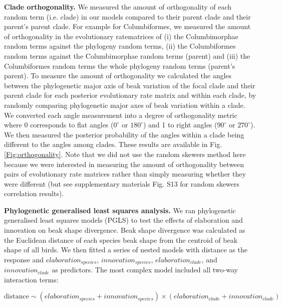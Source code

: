 \documentclass[12pt,letterpaper]{article}
\begin{document}
\textbf{Clade orthogonality.} We measured the amount of orthogonality of each random term (i.e.
clade) in our models compared to their parent clade and their parent's parent clade.
For example for Columbiformes, we measured the amount of orthogonality in the evolutionary ratematrices of (i) the Columbimorphae random terms against the phylogeny random terms, (ii) the Columbiformes random terms against the Columbimorphae random terms (parent) and (iii) the Columbiformes random terms the whole phylogeny random terms (parent's parent).
To measure the amount of orthogonality we calculated the angles between the phylogenetic major axis of beak variation of the focal clade and their parent clade for each posterior evolutionary rate matrix and within each clade, by randomly comparing phylogenetic major axes of beak variation within a clade.
We converted each angle measurement into a degree of orthogonality metric where 0 corresponds to flat angles ($0^\circ$ or  $180^\circ$) and 1 to right angles ($90^\circ$ or $270^\circ$).
We then measured the posterior probability of the angles within a clade being different to the angles among clades.
These results are available in Fig. \ref{Fig:orthogonality}.
Note that we did not use the random skewers method here \cite{cheverud2007research} because we were interested in measuring the amount of orthogonality between pairs of evolutionary rate matrices rather than simply measuring whether they were different (but see supplementary materials Fig. S13 for random skewers correlation results). %

\textbf{Phylogenetic generalised least squares analysis.} %
We ran phylogenetic generalised least squares models (PGLS) to test the effects of elaboration and innovation on beak shape divergence.
Beak shape divergence was calculated as the Euclidean distance of each species beak shape from the centroid of beak shape of all birds.
We then fitted a series of nested models with distance as the response and $elaboration_{species}$, $innovation_{species}$, $elaboration_{clade}$, and $innovation_{clade}$ as predictors.
The most complex model included all two-way interaction terms:

\begin{equation}
\text{distance} \mathtt{\sim} (elaboration_{species} + innovation_{species}) \times (elaboration_{clade} + innovation_{clade})
\end{equation}
\end{document}
